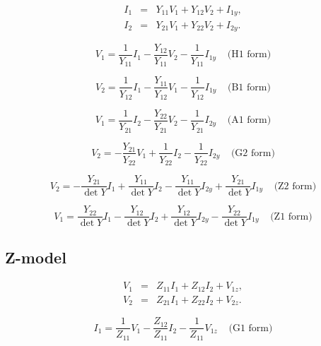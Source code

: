 \documentclass[a4paper, 12pt]{article}
\newcommand{\bigspace}{\;\;\;\;}
\begin{document}
\begin{eqnarray}
\label{eqn:YI1}
  I_1 & = & Y_{11} V_1 + Y_{12} V_2 + I_{1y}, \\
  I_2 & = & Y_{21} V_1 + Y_{22} V_2 + I_{2y}.
\label{eqn:YI2}
\end{eqnarray}



\begin{equation}
  V_1 = \frac{1}{Y_{11}} I_1 - \frac{Y_{12}}{Y_{11}} V_2 - \frac{1}{Y_{11}} I_{1y} \bigspace \mbox{(H1 form)}
\end{equation}

\begin{equation}
  V_2 = \frac{1}{Y_{12}} I_1 - \frac{Y_{11}}{Y_{12}} V_1 - \frac{1}{Y_{12}} I_{1y} \bigspace \mbox{(B1 form)}
\end{equation}

\begin{equation}
  V_1 = \frac{1}{Y_{21}} I_2 - \frac{Y_{22}}{Y_{21}} V_2 - \frac{1}{Y_{21}} I_{2y} \bigspace \mbox{(A1 form)}
\end{equation}


\begin{equation}
  V_2 = -\frac{Y_{21}}{Y_{22}} V_1 + \frac{1}{Y_{22}} I_2 - \frac{1}{Y_{22}} I_{2y} \bigspace \mbox{(G2 form)}
\end{equation}


\begin{equation}
  V_2 = -\frac{Y_{21}}{\det{Y}} I_1 + \frac{Y_{11}}{\det{Y}} I_2 - \frac{Y_{11}}{\det{Y}} I_{2y} + \frac{Y_{21}}{\det{Y}} I_{1y} \bigspace \mbox{(Z2 form)}
\end{equation}


\begin{equation}
  V_1 = \frac{Y_{22}}{\det{Y}} I_1 - \frac{Y_{12}}{\det{Y}} I_2 + \frac{Y_{12}}{\det{Y}} I_{2y} - \frac{Y_{22}}{\det{Y}} I_{1y} \bigspace \mbox{(Z1 form)}
\end{equation}


\subsection{Z-model}

\begin{eqnarray}
\label{eqn:ZV1}
  V_1 & = & Z_{11} I_1 + Z_{12} I_2 + V_{1z}, \\
  V_2 & = & Z_{21} I_1 + Z_{22} I_2 + V_{2z}.
\label{eqn:ZV2}
\end{eqnarray}

\begin{equation}
  I_1 = \frac{1}{Z_{11}} V_1 - \frac{Z_{12}}{Z_{11}} I_2 - \frac{1}{Z_{11}} V_{1z} \bigspace \mbox{(G1 form)}
\end{equation}
\end{document}

